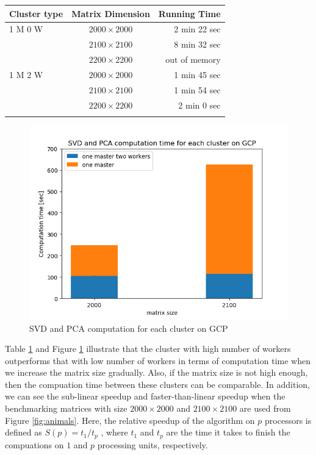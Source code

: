 \documentclass[]{article}
\begin{document}
\begin{longtable}[]{@{}lcr@{}}
\toprule
Cluster type & Matrix Dimension & Running Time\tabularnewline
\midrule
\endhead
1 M 0 W & \(2000\times2000\) & 2 min 22 sec\tabularnewline
& \(2100\times2100\) & 8 min 32 sec\tabularnewline
& \(2200\times2200\) & out of memory\tabularnewline
1 M 2 W & \(2000\times2000\) & 1 min 45 sec\tabularnewline
& \(2100\times2100\) & 1 min 54 sec\tabularnewline
& \(2200\times2200\) & 2 min 0 sec\tabularnewline
\bottomrule
\label{tab:table_1}
\end{longtable}

\begin{figure}
\centering
\includegraphics{Figure_1.png}
\caption{SVD and PCA computation for each cluster on GCP}
\label{fig:figure_1}
\end{figure}

Table \ref{tab:table_1} and Figure \ref{fig:figure_1} illustrate that the cluster with high number of
workers outperforms that with low number of workers in terms of
computation time when we increase the matrix size gradually. Also, if
the matrix size is not high enough, then the compuation time between
these clusters can be comparable. In addition, we can see the sub-linear
speedup and faster-than-linear speedup when the benchmarking matrices
with size \(2000\times 2000\) and \(2100\times 2100\) are used from Figure \ref{fig:animals}. Here,
the relative speedup of the algorithm on \(p\) processors is defined as
\(S(p) = t_1/t_p\) , where \(t_1\) and \(t_p\) are the time it takes to
finish the compuations on \(1\) and \(p\) processing units,
respectively.
\end{document}
